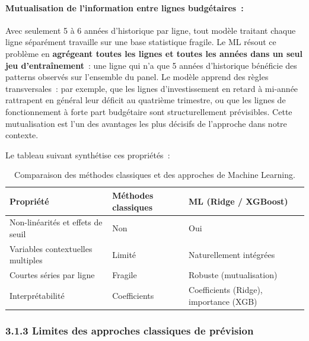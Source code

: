 \paragraph{Mutualisation de l'information entre lignes budg\'etaires~:}

Avec seulement 5 \`a 6 ann\'ees d'historique par ligne, tout mod\`ele traitant
chaque ligne s\'epar\'ement travaille sur une base statistique fragile. Le ML
r\'esout ce probl\`eme en \textbf{agr\'egeant toutes les lignes et toutes les
ann\'ees dans un seul jeu d'entra\^inement}~: une ligne qui n'a que 5 ann\'ees
d'historique b\'en\'eficie des patterns observ\'es sur l'ensemble du panel. Le
mod\`ele apprend des r\`egles transversales~: par exemple, que les lignes
d'investissement en retard \`a mi-ann\'ee rattrapent en g\'en\'eral leur d\'eficit
au quatri\`eme trimestre, ou que les lignes de fonctionnement \`a forte part
budg\'etaire sont structurellement pr\'evisibles. Cette mutualisation est l'un
des avantages les plus d\'ecisifs de l'approche dans notre contexte.

\vspace{4pt}
Le tableau suivant synth\'etise ces propri\'et\'es~:

\begin{table}[h]
\centering
\caption{Comparaison des m\'ethodes classiques et des approches de Machine Learning.}
\label{tab:comparaison-ml}
\begin{tabular}{lll}
\hline
\textbf{Propri\'et\'e} & \textbf{M\'ethodes classiques}
& \textbf{ML (Ridge / XGBoost)} \\
\hline
Non-linéarités et effets de seuil & Non & Oui \\
Variables contextuelles multiples & Limité & Naturellement intégrées \\
Courtes séries par ligne & Fragile & Robuste (mutualisation) \\
Interprétabilité & Coefficients & Coefficients (Ridge), importance (XGB) \\
\hline
\end{tabular}
\end{table}

\subsubsection*{3.1.3 \quad Limites des approches classiques de prévision}

